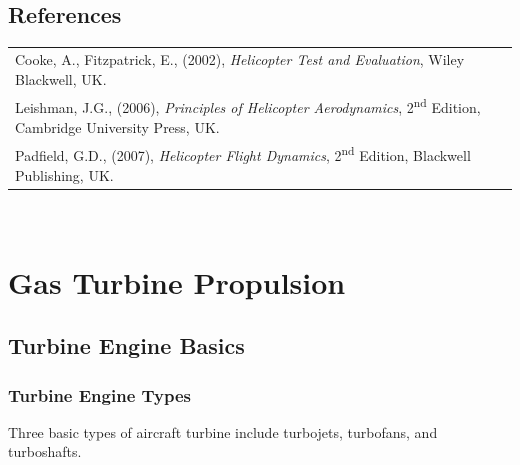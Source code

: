 \documentclass[
]{book}
\begin{document}
\hypertarget{references-13}{%
\section{References}\label{references-13}}

\begin{longtable}[]{@{}l@{}}
\toprule
\endhead
\begin{minipage}[t]{0.97\columnwidth}\raggedright
Cooke, A., Fitzpatrick, E., (2002), \emph{Helicopter Test and Evaluation}, Wiley Blackwell, UK.\strut
\end{minipage}\tabularnewline
\begin{minipage}[t]{0.97\columnwidth}\raggedright
Leishman, J.G., (2006), \emph{Principles of Helicopter Aerodynamics}, 2\textsuperscript{nd} Edition, Cambridge University Press, UK.\strut
\end{minipage}\tabularnewline
\begin{minipage}[t]{0.97\columnwidth}\raggedright
Padfield, G.D., (2007), \emph{Helicopter Flight Dynamics}, 2\textsuperscript{nd} Edition, Blackwell Publishing, UK.\strut
\end{minipage}\tabularnewline
\bottomrule
\end{longtable}

~

\hypertarget{gas-turbine-propulsion}{%
\chapter{Gas Turbine Propulsion}\label{gas-turbine-propulsion}}

\hypertarget{turbine-engine-basics}{%
\section{Turbine Engine Basics}\label{turbine-engine-basics}}

\hypertarget{turbine-engine-types}{%
\subsection{Turbine Engine Types}\label{turbine-engine-types}}

Three basic types of aircraft turbine include turbojets, turbofans, and
turboshafts.
\end{document}
